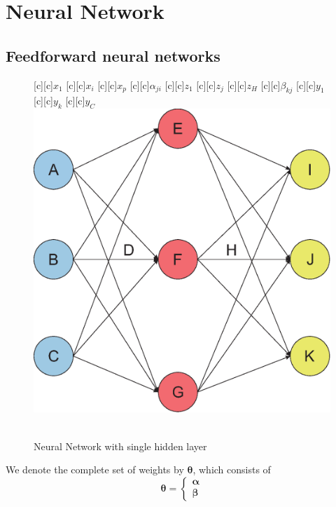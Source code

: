 \documentclass[12pt,a4paper]{article}%
\theoremstyle{definition}
\theoremstyle{plain}
\numberwithin{equation}{section}
\begin{document}
\setcounter{section}{10}
\section{Neural Network}
\subsection{Feedforward neural networks}
\begin{figure}[H]
[c][c]{$x_{1}$}
[c][c]{$x_{i}$}
[c][c]{$x_{p}$}
[c][c]{$\alpha_{ji}$}
[c][c]{$z_{1}$}
[c][c]{$z_{j}$}
[c][c]{$z_{H}$}
[c][c]{$\beta_{kj}$}
[c][c]{$y_{1}$}
[c][c]{$y_{k}$}
[c][c]{$y_{C}$}
\centering
\includegraphics[scale=0.6]{images//11_2.eps}
\\~\\
\caption{Neural Network with single hidden layer}\label{NN}
\end{figure}

We denote the complete set of weights by $\boldsymbol{\theta}$, which consists of
\begin{equation*}
\boldsymbol{\theta} = 
\left\{
\begin{array}{l}
\boldsymbol{\alpha} \\
\boldsymbol{\beta} 
\end{array} \right.
\end{equation*}
\end{document}
